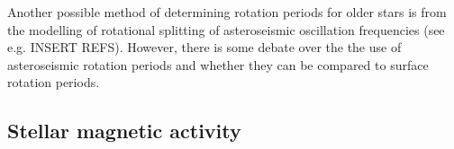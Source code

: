 Another possible method of determining rotation periods for older stars is from the modelling of rotational splitting of asteroseismic oscillation frequencies (see e.g. INSERT REFS). However, there is some debate over the the use of asteroseismic rotation periods and whether they can be compared to surface rotation periods. 

\subsection{Stellar magnetic activity}











